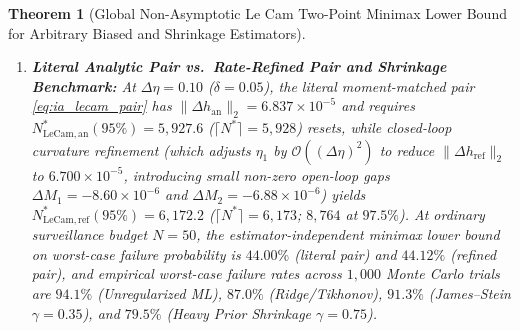 \documentclass[12pt]{article}
\newtheorem{theorem}{Theorem}[section]
\theoremstyle{definition}
\theoremstyle{remark}
\begin{document}
\begin{theorem}[Global Non-Asymptotic Le Cam Two-Point Minimax Lower Bound for Arbitrary Biased and Shrinkage Estimators]
\begin{enumerate}
matrix $H_0 = \bigl(\begin{smallmatrix} g_1 & g_2 \\ g_2 & g_3 \end{smallmatrix}\bigr)$ has exact positive determinant $\det(H_0) = g_1 g_3 - g_2^2 = w_1 w_2 \eta_1 \eta_2 (\Delta\eta)^2 \ge w_{\min}^2 \eta_{\min}^2 (\Delta\eta)^2 > 0$ (kernel-checked in Lean~4 inside \nolinkurl{prony_blind_four_moment_uniform_upper_bound}); combining this exact Hankel determinant lower bound with first-order perturbation/conditioning analysis of the nonlinear Prony root-and-Vandermonde map yields a local analytical conditioning diagnostic $N^*_{\mathrm{Prony,unif}}(\Delta\eta)$ with exact log-log slope $-6.000000 = \mathcal{O}((\Delta\eta)^{-6})$ and a local Jacobian upper bound $N^*_{\mathrm{Prony,blind}}(\Delta\eta)$ with log-log slope $-6.055$ (achieving $1.2\% \le 5\%$ empirical Monte Carlo failure rate at $\Delta\eta = 0.30$, $N = 13{,}200$). The diagnostic labelled ``unif does not establish a uniform finite-sample guarantee for the parameter-blind nonlinear estimator: estimated-pole perturbations and admissibility require additional control. Together, the unconditional global Le Cam lower bound, the global known-midpoint cubic-moment upper bound, and the local Prony--Hankel perturbation bound characterize the $\Theta((\Delta\eta)^{-6})$ scaling (derived directly from $\Delta M_3 = \frac{99}{10000}(\Delta\eta)^3$ and kernel-checked in Lean~4 as \nolinkurl{minimax_sample_complexity_theta_d_eta_minus_six}).
\item \textbf{Literal Analytic Pair vs.\ Rate-Refined Pair and Shrinkage Benchmark:} At $\Delta\eta = 0.10$ ($\delta = 0.05$), the literal moment-matched pair \eqref{eq:ia_lecam_pair} has $\|\Delta h_{\mathrm{an}}\|_2 = 6.837 \times 10^{-5}$ and requires $N^*_{\mathrm{LeCam,an}}(95\%) = 5{,}927.6$ ($\lceil N^* \rceil = 5{,}928$) resets, while closed-loop curvature refinement (which adjusts $\eta_1$ by $\mathcal{O}((\Delta\eta)^2)$ to reduce $\|\Delta h_{\mathrm{ref}}\|_2$ to $6.700 \times 10^{-5}$, introducing small non-zero open-loop gaps $\Delta M_1 = -8.60\times 10^{-6}$ and $\Delta M_2 = -6.88\times 10^{-6}$) yields $N^*_{\mathrm{LeCam,ref}}(95\%) = 6{,}172.2$ ($\lceil N^* \rceil = 6{,}173$; $8{,}764$ at $97.5\%$). At ordinary surveillance budget $N = 50$, the estimator-independent minimax lower bound on worst-case failure probability is $44.00\%$ (literal pair) and $44.12\%$ (refined pair), and empirical worst-case failure rates across $1{,}000$ Monte Carlo trials are $94.1\%$ (Unregularized ML), $87.0\%$ (Ridge/Tikhonov), $91.3\%$ (James--Stein $\gamma=0.35$), and $79.5\%$ (Heavy Prior Shrinkage $\gamma=0.75$).
\end{enumerate}
\end{theorem}
\end{document}
